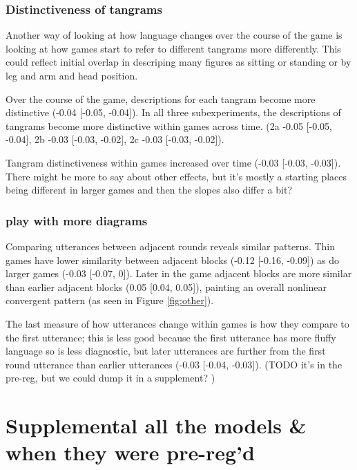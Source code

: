 \documentclass[
  english,
  a4paper,
]{article}
\begin{document}
\hypertarget{distinctiveness-of-tangrams}{%
\subsubsection{Distinctiveness of tangrams}\label{distinctiveness-of-tangrams}}

Another way of looking at how language changes over the course of the game is looking at how games start to refer to different tangrams more differently. This could reflect initial overlap in descriping many figures as sitting or standing or by leg and arm and head position.

Over the course of the game, descriptions for each tangram become more distinctive (-0.04 {[}-0.05, -0.04{]}).
In all three subexperiments, the descriptions of tangrams become more distinctive within games across time. (2a -0.05 {[}-0.05, -0.04{]}, 2b -0.03 {[}-0.03, -0.02{]}, 2c -0.03 {[}-0.03, -0.02{]}).

Tangram distinctiveness within games increased over time (-0.03 {[}-0.03, -0.03{]}). There might be more to say about other effects, but it's mostly a starting places being different in larger games and then the slopes also differ a bit?

\hypertarget{play-with-more-diagrams}{%
\subsubsection{play with more diagrams}\label{play-with-more-diagrams}}

Comparing utterances between adjacent rounds reveals similar patterns. Thin games have lower similarity between adjacent blocks (-0.12 {[}-0.16, -0.09{]}) as do larger games (-0.03 {[}-0.07, 0{]}). Later in the game adjacent blocks are more similar than earlier adjacent blocks (0.05 {[}0.04, 0.05{]}), painting an overall nonlinear convergent pattern (as seen in Figure \ref{fig:other}).

The last measure of how utterances change within games is how they compare to the first utterance; this is less good because the first utterance has more fluffy language so is less diagnostic, but later utterances are further from the first round utterance than earlier utterances (-0.03 {[}-0.04, -0.03{]}). (TODO it's in the pre-reg, but we could dump it in a supplement? )

\hypertarget{supplemental-all-the-models-when-they-were-pre-regd}{%
\section{Supplemental all the models \& when they were pre-reg'd}\label{supplemental-all-the-models-when-they-were-pre-regd}}
\end{document}
